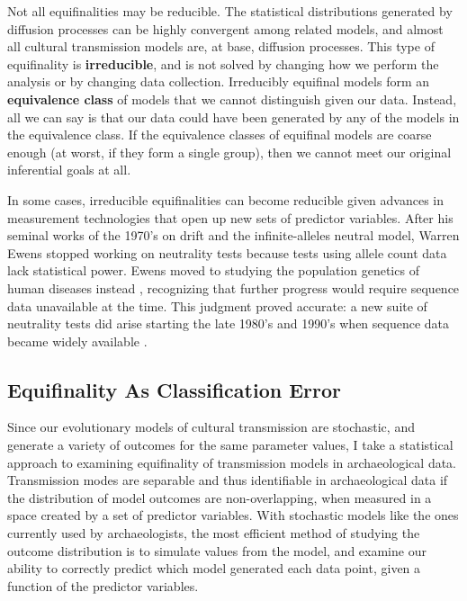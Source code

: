 \documentclass[10pt,letterpaper]{article}
\begin{document}
Not all equifinalities may be reducible.  The statistical distributions generated by diffusion processes can be highly convergent among related models, and almost all cultural transmission models are, at base, diffusion processes. This type of equifinality is \textbf{irreducible}, and is not solved by changing how we perform the analysis or by changing data collection. Irreducibly equifinal
models form an \textbf{equivalence class} of models that we cannot
distinguish given our data. Instead, all we can say is that our data
could have been generated by any of the models in the equivalence class.  
If the equivalence classes of equifinal models are coarse enough (at worst, if they 
form a single group), then we cannot meet our original inferential goals at all. 

In some cases, irreducible equifinalities can become reducible given advances in measurement technologies that open up new sets of predictor variables.  After his seminal works of the 1970's on drift and the infinite-alleles neutral model, Warren Ewens stopped working on neutrality tests because tests using allele count data lack statistical power.  Ewens moved to studying the population genetics of human diseases instead \cite{plutinski2004}, recognizing that further progress would require sequence data unavailable at the time.  This judgment proved accurate:  a new suite of neutrality tests did arise starting the late 1980's and 1990's when sequence data became widely available \cite{fu1993statistical,tajima1989statistical}.     


\subsection{Equifinality As Classification Error}
\label{sec:equifinality-classification-error}

Since our evolutionary models of cultural transmission are stochastic, and generate a variety of outcomes for the same parameter values, I take a statistical approach to examining equifinality of transmission models in archaeological data.  Transmission modes are separable and thus identifiable in archaeological data if the distribution of model outcomes are non-overlapping, when measured in a space created by a set of predictor variables.  With stochastic models like the ones currently used by archaeologists, the most efficient method of studying the outcome distribution is to simulate values from the model, and examine our ability to correctly predict which model generated each data point, given a function of the predictor variables.  
\end{document}
